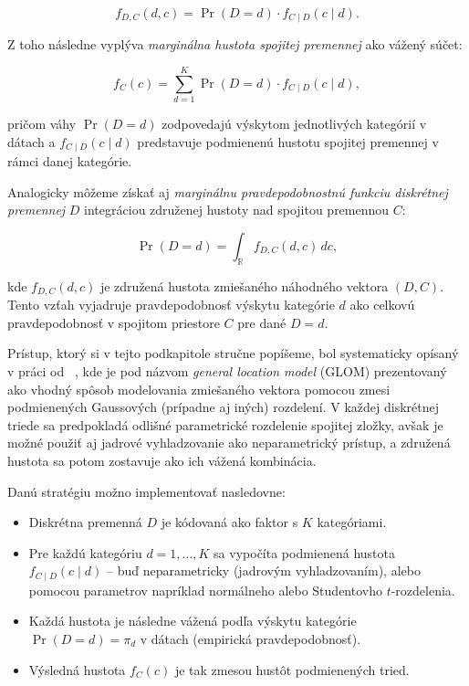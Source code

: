\begin{equation}
f_{D,C}(d, c) = \Pr(D = d) \cdot f_{C \mid D}(c \mid d).
\end{equation}

Z toho následne vyplýva \textit{marginálna hustota spojitej premennej} ako vážený súčet:

\begin{equation}
f_C(c) = \sum_{d=1}^{K} \Pr(D = d) \cdot f_{C \mid D}(c \mid d),
\end{equation}

pričom váhy $\Pr(D = d)$ zodpovedajú výskytom jednotlivých kategórií v dátach a $f_{C \mid D}(c \mid d)$ predstavuje podmienenú hustotu spojitej premennej v rámci danej kategórie.

Analogicky môžeme získať aj \textit{marginálnu pravdepodobnostnú funkciu diskrétnej premennej} $D$ integráciou združenej hustoty nad spojitou premennou $C$:

\begin{equation}
\Pr(D = d) = \int_{\mathbb{R}} f_{D,C}(d, c) \, dc,
\end{equation}

kde $f_{D,C}(d, c)$ je združená hustota zmiešaného náhodného vektora $(D, C)$. Tento vzťah vyjadruje pravdepodobnosť výskytu kategórie $d$ ako celkovú pravdepodobnosť v spojitom priestore $C$ pre dané $D = d$.

\bigskip

Prístup, ktorý si v tejto podkapitole stručne popíšeme, bol systematicky opísaný v práci od ~\textcite{pleisMixtureDissertation}, kde je pod názvom \textit{general location model} (GLOM) prezentovaný ako vhodný spôsob modelovania zmiešaného vektora pomocou zmesi podmienených Gaussových (prípadne aj iných) rozdelení. V každej diskrétnej triede sa predpokladá odlišné parametrické rozdelenie spojitej zložky, avšak je možné použiť aj jadrové vyhladzovanie ako neparametrický prístup, a združená hustota sa potom zostavuje ako ich vážená kombinácia.

Danú stratégiu možno implementovať nasledovne:
\begin{itemize}
  \item Diskrétna premenná $D$ je kódovaná ako faktor s $K$ kategóriami.
  \item Pre každú kategóriu $d = 1, \dots, K$ sa vypočíta podmienená hustota $f_{C \mid D}(c \mid d)$ – buď neparametricky (jadrovým vyhladzovaním), alebo pomocou parametrov napríklad normálneho alebo Studentovho $t$-rozdelenia.
  \item Každá hustota je následne vážená podľa výskytu kategórie $\Pr(D = d)=\pi_d$ v dátach (empirická pravdepodobnosť).
  \item Výsledná hustota $f_C(c)$ je tak zmesou hustôt podmienených tried.
\end{itemize}

